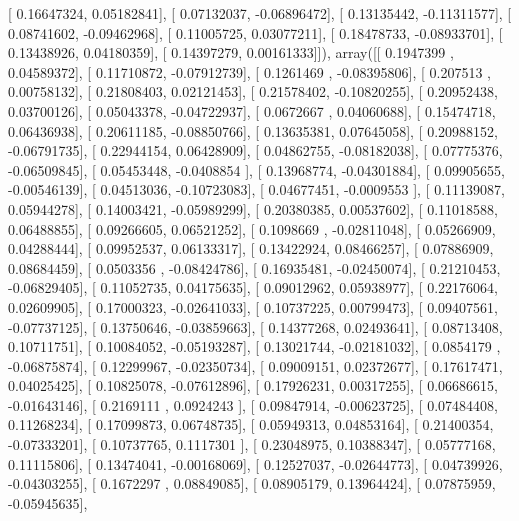 \documentclass{article}
\begin{document}
       [ 0.16647324,  0.05182841],
       [ 0.07132037, -0.06896472],
       [ 0.13135442, -0.11311577],
       [ 0.08741602, -0.09462968],
       [ 0.11005725,  0.03077211],
       [ 0.18478733, -0.08933701],
       [ 0.13438926,  0.04180359],
       [ 0.14397279,  0.00161333]]), array([[ 0.1947399 ,  0.04589372],
       [ 0.11710872, -0.07912739],
       [ 0.1261469 , -0.08395806],
       [ 0.207513  ,  0.00758132],
       [ 0.21808403,  0.02121453],
       [ 0.21578402, -0.10820255],
       [ 0.20952438,  0.03700126],
       [ 0.05043378, -0.04722937],
       [ 0.0672667 ,  0.04060688],
       [ 0.15474718,  0.06436938],
       [ 0.20611185, -0.08850766],
       [ 0.13635381,  0.07645058],
       [ 0.20988152, -0.06791735],
       [ 0.22944154,  0.06428909],
       [ 0.04862755, -0.08182038],
       [ 0.07775376, -0.06509845],
       [ 0.05453448, -0.0408854 ],
       [ 0.13968774, -0.04301884],
       [ 0.09905655, -0.00546139],
       [ 0.04513036, -0.10723083],
       [ 0.04677451, -0.0009553 ],
       [ 0.11139087,  0.05944278],
       [ 0.14003421, -0.05989299],
       [ 0.20380385,  0.00537602],
       [ 0.11018588,  0.06488855],
       [ 0.09266605,  0.06521252],
       [ 0.1098669 , -0.02811048],
       [ 0.05266909,  0.04288444],
       [ 0.09952537,  0.06133317],
       [ 0.13422924,  0.08466257],
       [ 0.07886909,  0.08684459],
       [ 0.0503356 , -0.08424786],
       [ 0.16935481, -0.02450074],
       [ 0.21210453, -0.06829405],
       [ 0.11052735,  0.04175635],
       [ 0.09012962,  0.05938977],
       [ 0.22176064,  0.02609905],
       [ 0.17000323, -0.02641033],
       [ 0.10737225,  0.00799473],
       [ 0.09407561, -0.07737125],
       [ 0.13750646, -0.03859663],
       [ 0.14377268,  0.02493641],
       [ 0.08713408,  0.10711751],
       [ 0.10084052, -0.05193287],
       [ 0.13021744, -0.02181032],
       [ 0.0854179 , -0.06875874],
       [ 0.12299967, -0.02350734],
       [ 0.09009151,  0.02372677],
       [ 0.17617471,  0.04025425],
       [ 0.10825078, -0.07612896],
       [ 0.17926231,  0.00317255],
       [ 0.06686615, -0.01643146],
       [ 0.2169111 ,  0.0924243 ],
       [ 0.09847914, -0.00623725],
       [ 0.07484408,  0.11268234],
       [ 0.17099873,  0.06748735],
       [ 0.05949313,  0.04853164],
       [ 0.21400354, -0.07333201],
       [ 0.10737765,  0.1117301 ],
       [ 0.23048975,  0.10388347],
       [ 0.05777168,  0.11115806],
       [ 0.13474041, -0.00168069],
       [ 0.12527037, -0.02644773],
       [ 0.04739926, -0.04303255],
       [ 0.1672297 ,  0.08849085],
       [ 0.08905179,  0.13964424],
       [ 0.07875959, -0.05945635],
\end{document}

